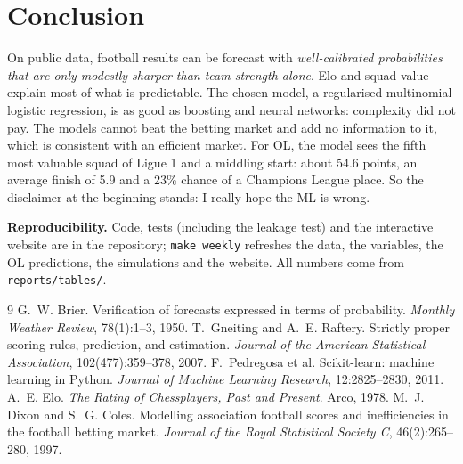 \documentclass[11pt,a4paper]{article}
\theoremstyle{definition}
\theoremstyle{remark}
\begin{document}
\section{Conclusion}

On public data, football results can be forecast with \emph{well-calibrated probabilities that are only modestly sharper than team strength alone}. Elo and squad value explain most of what is predictable.
The chosen model, a regularised multinomial logistic regression, is as good as boosting and neural networks: complexity did not pay. The models cannot beat the betting market and add no information to it,
which is consistent with an efficient market. For OL, the model sees the fifth most valuable squad of Ligue 1 and a middling start: about 54.6 points, an average finish of 5.9 and a 23\% chance of a Champions League place.
So the disclaimer at the beginning stands: I really hope the ML is wrong.

\textbf{Reproducibility.} Code, tests (including the leakage test) and the interactive website are in the repository; \texttt{make weekly} refreshes the data, the variables, the OL predictions, the simulations and the website. All numbers come from \texttt{reports/tables/}.
\begin{thebibliography}{9}\small
{} G.~W. Brier. Verification of forecasts expressed in terms of probability. \emph{Monthly Weather Review}, 78(1):1--3, 1950.
 T.~Gneiting and A.~E. Raftery. Strictly proper scoring rules, prediction, and estimation. \emph{Journal of the American Statistical Association}, 102(477):359--378, 2007.
 F.~Pedregosa et al. Scikit-learn: machine learning in Python. \emph{Journal of Machine Learning Research}, 12:2825--2830, 2011.
 A.~E. Elo. \emph{The Rating of Chessplayers, Past and Present}. Arco, 1978.
 M.~J. Dixon and S.~G. Coles. Modelling association football scores and inefficiencies in the football betting market. \emph{Journal of the Royal Statistical Society C}, 46(2):265--280, 1997.
\end{thebibliography}
\end{document}
